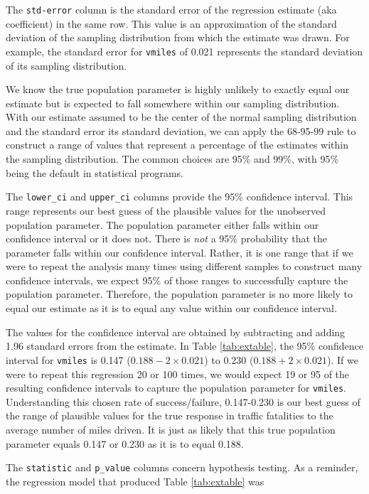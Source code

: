 \documentclass[
]{book}
\begin{document}
The \texttt{std-error} column is the standard error of the regression estimate (aka coefficient) in the same row. This value is an approximation of the standard deviation of the sampling distribution from which the estimate was drawn. For example, the standard error for \texttt{vmiles} of 0.021 represents the standard deviation of its sampling distribution.

We know the true population parameter is highly unlikely to exactly equal our estimate but is expected to fall somewhere within our sampling distribution. With our estimate assumed to be the center of the normal sampling distribution and the standard error its standard deviation, we can apply the 68-95-99 rule to construct a range of values that represent a percentage of the estimates within the sampling distribution. The common choices are 95\% and 99\%, with 95\% being the default in statistical programs.

The \texttt{lower\_ci} and \texttt{upper\_ci} columns provide the 95\% confidence interval. This range represents our best guess of the plausible values for the unobserved population parameter. The population parameter either falls within our confidence interval or it does not. There is \emph{not} a 95\% probability that the parameter falls within our confidence interval. Rather, it is one range that if we were to repeat the analysis many times using different samples to construct many confidence intervals, we expect 95\% of those ranges to successfully capture the population parameter. Therefore, the population parameter is no more likely to equal our estimate as it is to equal any value within our confidence interval.

The values for the confidence interval are obtained by subtracting and adding 1.96 standard errors from the estimate. In Table \ref{tab:extable}, the 95\% confidence interval for \texttt{vmiles} is 0.147 (\(0.188-2\times 0.021\)) to 0.230 (\(0.188+2\times 0.021\)). If we were to repeat this regression 20 or 100 times, we would expect 19 or 95 of the resulting confidence intervals to capture the population parameter for \texttt{vmiles}. Understanding this chosen rate of success/failure, 0.147-0.230 is our best guess of the range of plausible values for the true response in traffic fatalities to the average number of miles driven. It is just as likely that this true population parameter equals 0.147 or 0.230 as it is to equal 0.188.

The \texttt{statistic} and \texttt{p\_value} columns concern hypothesis testing. As a reminder, the regression model that produced Table \ref{tab:extable} was
\end{document}
